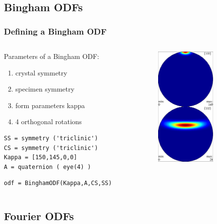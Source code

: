 \subsection*{Bingham ODFs}

\begin{frame}[fragile]
  \frametitle{Defining a Bingham ODF}
  \begin{columns}

    \begin{column}{8.5cm}
		
			Parameters of a Bingham ODF:
      \begin{enumerate}
      \item crystal symmetry
      \item specimen symmetry
      \item form parameters kappa
      \item 4 orthogonal rotations
      \end{enumerate}


\begin{lstlisting}
SS = symmetry ('triclinic')
CS = symmetry ('triclinic')
Kappa = [150,145,0,0]
A = quaternion ( eye(4) )
\end{lstlisting}

\begin{lstlisting}
odf = BinghamODF(Kappa,A,CS,SS)
\end{lstlisting}


\end{column}

    \begin{column}{3cm}
      \includegraphics[width=3cm]{pic/binghamODF}
    \end{column}
  \end{columns}

\end{frame}

\subsection*{Fourier ODFs}

